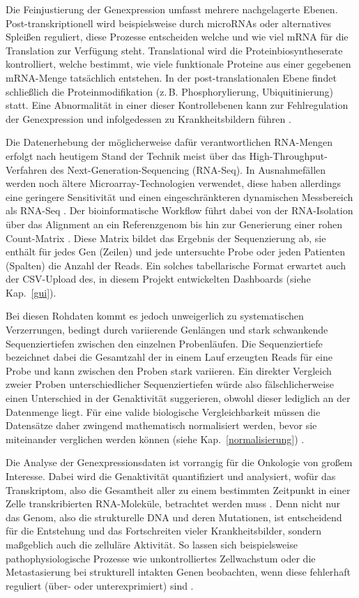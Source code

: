 \documentclass[12pt]{article}
\begin{document}
Die Feinjustierung der Genexpression umfasst mehrere nachgelagerte Ebenen. Post-transkriptionell wird beispielsweise durch microRNAs oder alternatives Spleißen reguliert, diese Prozesse entscheiden welche und wie viel mRNA für die Translation zur Verfügung steht. Translational wird die Proteinbiosyntheserate kontrolliert, welche bestimmt, wie viele funktionale Proteine aus einer gegebenen mRNA-Menge tatsächlich entstehen. In der post-translationalen Ebene findet schließlich die Proteinmodifikation (z.\,B. Phosphorylierung, Ubiquitinierung) statt. Eine Abnormalität in einer dieser Kontrollebenen kann zur Fehlregulation der Genexpression und infolgedessen zu Krankheitsbildern führen \cite{LeeYoung2013}.

Die Datenerhebung der möglicherweise dafür verantwortlichen RNA-Mengen erfolgt nach heutigem Stand der Technik meist über das High-Throughput-Verfahren des Next-Generation-Sequencing (RNA-Seq). In Ausnahmefällen werden noch ältere Microarray-Technologien verwendet, diese haben allerdings eine geringere Sensitivität und einen eingeschränkteren dynamischen Messbereich als RNA-Seq \cite{Wang2009}. Der bioinformatische Workflow führt dabei von der RNA-Isolation über das Alignment an ein Referenzgenom bis hin zur Generierung einer rohen Count-Matrix \cite{Kukurba2015}. Diese Matrix bildet das Ergebnis der Sequenzierung ab, sie enthält für jedes Gen (Zeilen) und jede untersuchte Probe oder jeden Patienten (Spalten) die Anzahl der Reads. Ein solches tabellarische Format erwartet auch der CSV-Upload des, in diesem Projekt entwickelten Dashboards (siehe Kap.~\ref{gui}).

Bei diesen Rohdaten kommt es jedoch unweigerlich zu systematischen Verzerrungen, bedingt durch variierende Genlängen und stark schwankende Sequenziertiefen zwischen den einzelnen Probenläufen. Die Sequenziertiefe bezeichnet dabei die Gesamtzahl der in einem Lauf erzeugten Reads für eine Probe und kann zwischen den Proben stark variieren. Ein direkter Vergleich zweier Proben unterschiedlicher Sequenziertiefen würde also fälschlicherweise einen Unterschied in der Genaktivität suggerieren, obwohl dieser lediglich an der Datenmenge liegt. Für eine valide biologische Vergleichbarkeit müssen die Datensätze daher zwingend mathematisch normalisiert werden, bevor sie miteinander verglichen werden können (siehe Kap.~\ref{normalisierung}) \cite{Oshlack2010}.

Die Analyse der Genexpressionsdaten ist vorrangig für die Onkologie von großem Interesse. Dabei wird die Genaktivität quantifiziert und analysiert, wofür das Transkriptom, also die Gesamtheit aller zu einem bestimmten Zeitpunkt in einer Zelle transkribierten RNA-Moleküle, betrachtet werden muss \cite{Conesa2016}. Denn nicht nur das Genom, also die strukturelle DNA und deren Mutationen, ist entscheidend für die Entstehung und das Fortschreiten vieler Krankheitsbilder, sondern maßgeblich auch die zelluläre Aktivität. So lassen sich beispielsweise pathophysiologische Prozesse wie unkontrolliertes Zellwachstum oder die Metastasierung bei strukturell intakten Genen beobachten, wenn diese fehlerhaft reguliert (über- oder unterexprimiert) sind \cite{Vogelstein2013}.
\end{document}

